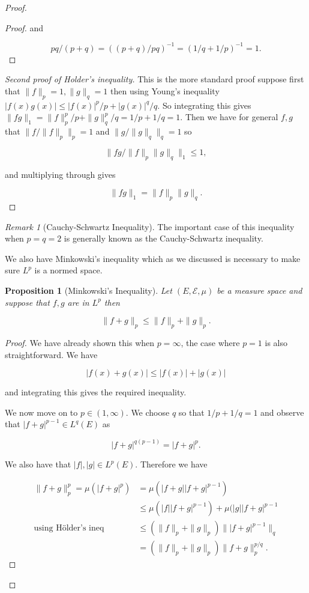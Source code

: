 \documentclass[
]{book}
\newtheorem{proposition}{Proposition}[chapter]
\theoremstyle{definition}
\theoremstyle{definition}
\theoremstyle{definition}
\theoremstyle{definition}
\theoremstyle{remark}
\newtheorem*{remark}{Remark}
\begin{document}
\begin{proof}
\begin{proof}
and

\[ pq/(p+q) = \left( (p+q)/pq \right)^{-1} = \left( 1/q + 1/p \right)^{-1} = 1. \]
\end{proof}

\begin{proof}[Second proof of Holder's inequality]
This is the more standard proof suppose first that \(\|f\|_p =1, \|g\|_q = 1\) then using Young's inequality \(|f(x)g(x)| \leq |f(x)|^p/p + |g(x)|^q/q\). So integrating this gives \(\|fg\|_1 = \|f\|^p_p/p + \|g\|^p_q/q = 1/p + 1/q = 1\). Then we have for general \(f,g\) that \(\|f/\|f\|_p\|_p = 1\) and \(\|g/\|g\|_q\|_q = 1\) so

\[ \| fg/ \|f\|_p \|g\|_q\|_1 \leq 1,  \]

and multiplying through gives

\[ \|fg\|_1 = \|f\|_p \|g\|_q.\]
\end{proof}

\begin{remark}[Cauchy-Schwartz Inequality]
The important case of this inequality when \(p=q=2\) is generally known as the Cauchy-Schwartz inequality.
\end{remark}

We also have Minkowski's inequality which as we discussed is necessary to make sure \(L^p\) is a normed space.

\begin{proposition}[Minkowski's Inequality]
Let \((E, \mathcal{E}, \mu)\) be a measure space and suppose that \(f,g\) are in \(L^p\) then

\[ \|f+g\|_p \leq \|f\|_p + \|g \|_p. \]
\end{proposition}

\begin{proof}
We have already shown this when \(p=\infty\), the case where \(p=1\) is also straightforward. We have

\[ |f(x) + g(x)| \leq |f(x)| + |g(x)| \]

and integrating this gives the required inequality.

We now move on to \(p \in (1, \infty)\). We choose \(q\) so that \(1/p + 1/q = 1\) and observe that \(|f + g|^{p-1} \in L^q(E)\) as

\[ |f+g|^{q(p-1)}= |f+g|^p. \]

We also have that \(|f|,|g| \in L^p(E)\). Therefore we have

\begin{align*}\|f+g\|_p^p = \mu(|f+g|^p) &= \mu(|f+g| |f+g|^{p-1}) \\
& \leq \mu(|f| |f+g|^{p-1}) + \mu (|g| |f+g|^{p-1} \\
\mbox{using Hölder's ineq} \quad & \leq \left( \|f\|_p + \|g\|_p\right) \| |f+g|^{p-1}\|_q \\
&= \left( \|f\|_p + \|g\|_p \right) \|f+g\|_p^{p/q}.
\end{align*}


\end{proof}
\end{proof}
\end{document}
